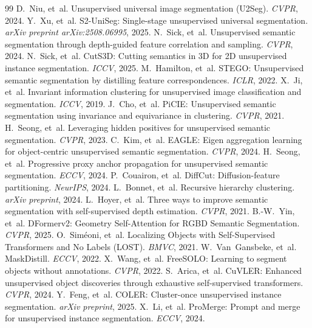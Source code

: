 \documentclass{article}
\begin{document}
\begin{thebibliography}{99}
 D.~Niu, et~al. Unsupervised universal image segmentation (U2Seg). \emph{CVPR}, 2024.
 Y.~Xu, et~al. S2-UniSeg: Single-stage unsupervised universal segmentation. \emph{arXiv preprint arXiv:2508.06995}, 2025.
 N.~Sick, et~al. Unsupervised semantic segmentation through depth-guided feature correlation and sampling. \emph{CVPR}, 2024.
 N.~Sick, et~al. CutS3D: Cutting semantics in 3D for 2D unsupervised instance segmentation. \emph{ICCV}, 2025.
 M.~Hamilton, et~al. STEGO: Unsupervised semantic segmentation by distilling feature correspondences. \emph{ICLR}, 2022.
 X.~Ji, et~al. Invariant information clustering for unsupervised image classification and segmentation. \emph{ICCV}, 2019.
 J.~Cho, et~al. PiCIE: Unsupervised semantic segmentation using invariance and equivariance in clustering. \emph{CVPR}, 2021.
 H.~Seong, et~al. Leveraging hidden positives for unsupervised semantic segmentation. \emph{CVPR}, 2023.
 C.~Kim, et~al. EAGLE: Eigen aggregation learning for object-centric unsupervised semantic segmentation. \emph{CVPR}, 2024.
 H.~Seong, et~al. Progressive proxy anchor propagation for unsupervised semantic segmentation. \emph{ECCV}, 2024.
 P.~Couairon, et~al. DiffCut: Diffusion-feature partitioning. \emph{NeurIPS}, 2024.
 L.~Bonnet, et~al. Recursive hierarchy clustering. \emph{arXiv preprint}, 2024.
 L.~Hoyer, et~al. Three ways to improve semantic segmentation with self-supervised depth estimation. \emph{CVPR}, 2021.
 B.-W.~Yin, et~al. DFormerv2: Geometry Self-Attention for RGBD Semantic Segmentation. \emph{CVPR}, 2025.
 O.~Sim\'eoni, et~al. Localizing Objects with Self-Supervised Transformers and No Labels (LOST). \emph{BMVC}, 2021.
 W.~Van~Gansbeke, et~al. MaskDistill. \emph{ECCV}, 2022.
 X.~Wang, et~al. FreeSOLO: Learning to segment objects without annotations. \emph{CVPR}, 2022.
 S.~Arica, et~al. CuVLER: Enhanced unsupervised object discoveries through exhaustive self-supervised transformers. \emph{CVPR}, 2024.
 Y.~Feng, et~al. COLER: Cluster-once unsupervised instance segmentation. \emph{arXiv preprint}, 2025.
 X.~Li, et~al. ProMerge: Prompt and merge for unsupervised instance segmentation. \emph{ECCV}, 2024.

\end{thebibliography}
\end{document}
